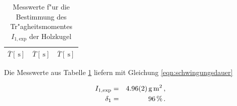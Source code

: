 				\begin{table}[h!]
					\begin{center}
						\caption{Messwerte f"ur die Bestimmung des Tr"agheitsmomentes $I_\mathrm{1, exp}$ der Holzkugel \label{tabelle:kugel}}
						\begin{tabular}{|c||c||c|}
							\hline
							$\overline{T} [\SI{}{\second}]$ & $\overline{T} [\SI{}{\second}]$ & $\overline{T} [\SI{}{\second}]$ \\
							\hline 
							\hline
							
							\hline 
						\end{tabular}
					\end{center}
				\end{table}

				Die Messwerte aus Tabelle \ref{tabelle:kugel} liefern mit Gleichung \eqref{eqn:schwingungsdauer}

				\begin{eqnarray*}
					I_\mathrm{1, exp} & = & \SI{4.96 (2)}{\gram \meter \squared} \,, \\
					\delta_1 & = & \SI{96}{\percent} \,.
				\end{eqnarray*}

			\clearpage
